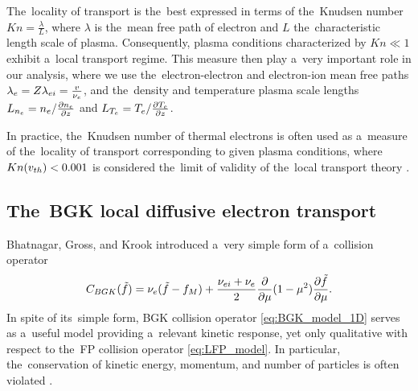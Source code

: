 The~locality of transport is the~best expressed in terms of the~Knudsen number
$Kn=\frac{\lambda}{L}$, where $\lambda$ is the~mean free path of electron and
$L$ the~characteristic length scale of plasma. Consequently, plasma conditions
characterized by $Kn\ll1$ exhibit a~local transport regime. This measure then
play a~very important role in our analysis, where we use the~electron-electron
and electron-ion mean free paths $\lambda_e = Z\lambda_{ei} = \frac{v}{\nu_{e}}$,
and the~density and temperature plasma scale lengths 
$L_{n_e} = n_e/\frac{\partial{n_e}}{\partial{z}}$ and $L_{T_e} = T_e/\frac{\partial{T_e}}{\partial{z}}$.

In practice, the~Knudsen number of thermal electrons is often used as 
a~measure of the~locality of transport corresponding to given plasma conditions,
where $Kn(v_{th})<0.001$ is considered the~limit of validity of 
the~local transport theory \cite{LMV_1983_7}.


\subsection{The~BGK local diffusive electron transport}
\label{sec:BGKDiffusiveRegime}

Bhatnagar, Gross, and Krook  introduced a~very simple form
of a~collision operator \cite{BGK_1954}
\begin{equation}
  C_{BGK}(\tilde{f})
  =
  \nu_{e}(\tilde{f} - f_M)
  + \frac{\nu_{ei} + \nu_{e}}{2}
  \frac{\partial{}}{\partial{\mu}}(1 - \mu^2)\frac{\partial{\tilde{f}}}{\partial{\mu}} .
  \label{eq:BGK_model_1D}
\end{equation}
In spite of its~simple form, BGK collision operator \eqref{eq:BGK_model_1D} 
serves as a~useful model providing a~relevant kinetic response, yet only 
qualitative with respect to the~FP collision operator \eqref{eq:LFP_model}.
In particular, the~conservation of kinetic energy, momentum, 
and number of particles is often violated 
\cite{Shkarofsky_Particle_Kinetics_book_1966_24}.



